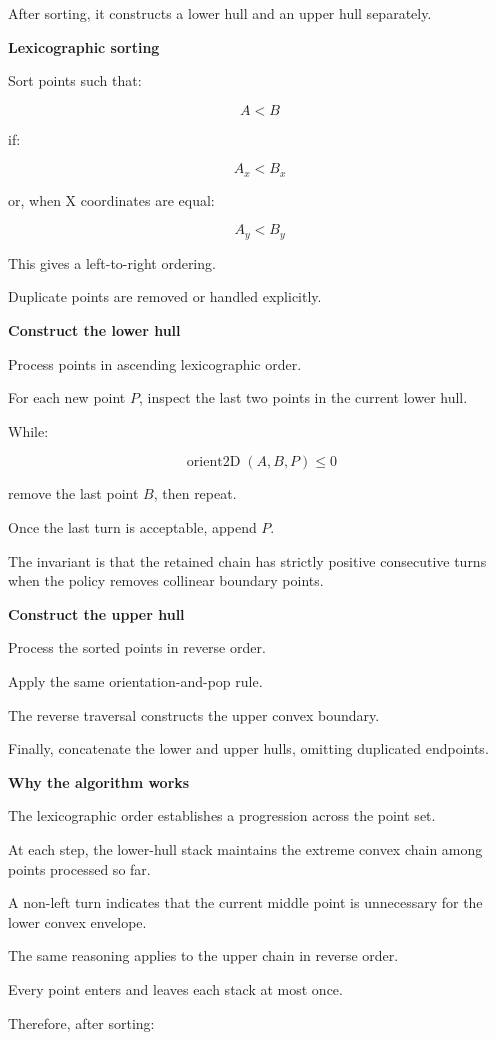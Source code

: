 After sorting, it constructs a lower hull and an upper hull separately.

\textbf{Lexicographic sorting}

Sort points such that:

\[
A<B
\]

if:

\[
A_x<B_x
\]

or, when X coordinates are equal:

\[
A_y<B_y
\]

This gives a left-to-right ordering.

Duplicate points are removed or handled explicitly.

\textbf{Construct the lower hull}

Process points in ascending lexicographic order.

For each new point \(P\), inspect the last two points in the current lower hull.

While:

\[
\operatorname{orient2D}(A,B,P)\le0
\]

remove the last point \(B\), then repeat.

Once the last turn is acceptable, append \(P\).

The invariant is that the retained chain has strictly positive consecutive turns when the policy removes collinear boundary points.

\textbf{Construct the upper hull}

Process the sorted points in reverse order.

Apply the same orientation-and-pop rule.

The reverse traversal constructs the upper convex boundary.

Finally, concatenate the lower and upper hulls, omitting duplicated endpoints.

\textbf{Why the algorithm works}

The lexicographic order establishes a progression across the point set.

At each step, the lower-hull stack maintains the extreme convex chain among points processed so far.

A non-left turn indicates that the current middle point is unnecessary for the lower convex envelope.

The same reasoning applies to the upper chain in reverse order.

Every point enters and leaves each stack at most once.

Therefore, after sorting:

